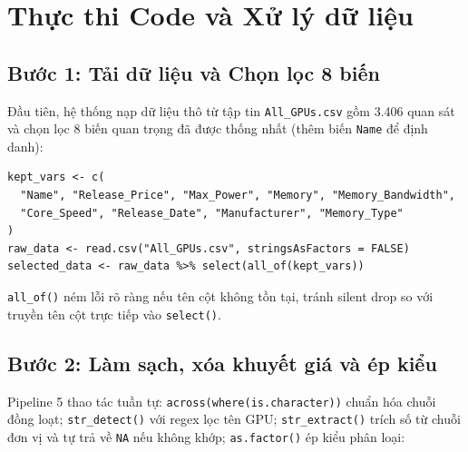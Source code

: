 \section{Thực thi Code và Xử lý dữ liệu}
\label{sec:code_xu_ly_du_lieu}

\subsection{Bước 1: Tải dữ liệu và Chọn lọc 8 biến}
\label{sec:buoc_1}
Đầu tiên, hệ thống nạp dữ liệu thô từ tập tin \texttt{All\_GPUs.csv} gồm 3.406 quan sát và chọn lọc 8 biến quan trọng đã được thống nhất (thêm biến \texttt{Name} để định danh):

\begin{verbatim}
kept_vars <- c(
  "Name", "Release_Price", "Max_Power", "Memory", "Memory_Bandwidth",
  "Core_Speed", "Release_Date", "Manufacturer", "Memory_Type"
)
raw_data <- read.csv("All_GPUs.csv", stringsAsFactors = FALSE)
selected_data <- raw_data %>% select(all_of(kept_vars))
\end{verbatim}
\texttt{all\_of()} ném lỗi rõ ràng nếu tên cột không tồn tại, tránh silent drop so với truyền tên cột trực tiếp vào \texttt{select()}.

\subsection{Bước 2: Làm sạch, xóa khuyết giá và ép kiểu}
\label{sec:buoc_2}
Pipeline 5 thao tác tuần tự: \texttt{across(where(is.character))} chuẩn hóa chuỗi đồng loạt; \texttt{str\_detect()} với regex lọc tên GPU; \texttt{str\_extract()} trích số từ chuỗi đơn vị và tự trả về \texttt{NA} nếu không khớp; \texttt{as.factor()} ép kiểu phân loại:

